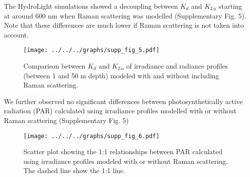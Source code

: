 \documentclass[12pt,a4paper]{scrartcl}
\newcommand{\ked}{\ensuremath{K_{d}}}
\newcommand{\klu}{\ensuremath{K_{Lu}}}
\begin{document}
The HydroLight simulations showed a decoupling between \ked{} and \klu{} starting at around 600 nm when Raman scattering was modelled (Supplementary Fig. 5). Note that these differences are much lower if Raman scattering is not taken into account.

\begin{figure}[H]
	\centering
	\texttt{[image: ../../../graphs/supp\_fig\_5.pdf]}
	\caption{Comparison between \ked{} and \klu{} of irradiance and radiance profiles (between 1 and 50 m depth) modeled with and without including Raman scattering.}
\end{figure}

We further observed no significant differences between photosynthetically active radiation (PAR) calculated using irradiance profiles modelled with or without Raman scattering (Supplementary Fig. 5)

\begin{figure}[H]
	\centering
	\texttt{[image: ../../../graphs/supp\_fig\_6.pdf]}
	\caption{Scatter plot showing the 1:1 relationships between PAR calculated using irradiance profiles modeled with or without Raman scattering. The dashed line show the 1:1 line.}
\end{figure}

\clearpage
\printbibliography
\end{document}
